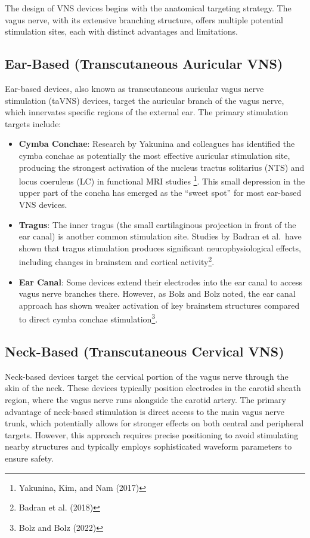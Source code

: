 \documentclass[
  Letterpaper,
]{scrbook}
\begin{document}
The design of VNS devices begins with the anatomical targeting strategy.
The vagus nerve, with its extensive branching structure, offers multiple
potential stimulation sites, each with distinct advantages and
limitations.

\subsection{Ear-Based (Transcutaneous Auricular
VNS)}\label{ear-based-transcutaneous-auricular-vns}

Ear-based devices, also known as transcutaneous auricular vagus nerve
stimulation (taVNS) devices, target the auricular branch of the vagus
nerve, which innervates specific regions of the external ear. The
primary stimulation targets include:

\begin{itemize}
\item
  \textbf{Cymba Conchae}: Research by Yakunina and colleagues has
  identified the cymba conchae as potentially the most effective
  auricular stimulation site, producing the strongest activation of the
  nucleus tractus solitarius (NTS) and locus coeruleus (LC) in
  functional MRI studies \footnote{Yakunina, Kim, and Nam (2017)}. This
  small depression in the upper part of the concha has emerged as the
  ``sweet spot'' for most ear-based VNS devices.
\item
  \textbf{Tragus}: The inner tragus (the small cartilaginous projection
  in front of the ear canal) is another common stimulation site. Studies
  by Badran et al.~have shown that tragus stimulation produces
  significant neurophysiological effects, including changes in brainstem
  and cortical activity\footnote{Badran et al. (2018)}.
\item
  \textbf{Ear Canal}: Some devices extend their electrodes into the ear
  canal to access vagus nerve branches there. However, as Bolz and Bolz
  noted, the ear canal approach has shown weaker activation of key
  brainstem structures compared to direct cymba conchae
  stimulation\footnote{Bolz and Bolz (2022)}.
\end{itemize}

\subsection{Neck-Based (Transcutaneous Cervical
VNS)}\label{neck-based-transcutaneous-cervical-vns}

Neck-based devices target the cervical portion of the vagus nerve
through the skin of the neck. These devices typically position
electrodes in the carotid sheath region, where the vagus nerve runs
alongside the carotid artery. The primary advantage of neck-based
stimulation is direct access to the main vagus nerve trunk, which
potentially allows for stronger effects on both central and peripheral
targets. However, this approach requires precise positioning to avoid
stimulating nearby structures and typically employs sophisticated
waveform parameters to ensure safety.
\end{document}
